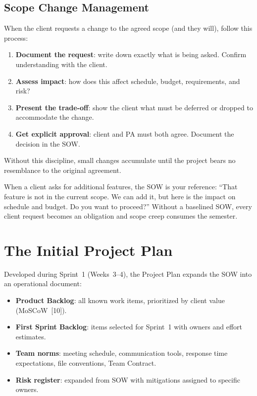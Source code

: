 \subsection{Scope Change Management}
When the client requests a change to the agreed scope (and they will), follow this process:
\begin{enumerate}[nosep,leftmargin=1.5em]
\item \textbf{Document the request}: write down exactly what is being asked. Confirm understanding with the client.
\item \textbf{Assess impact}: how does this affect schedule, budget, requirements, and risk?
\item \textbf{Present the trade-off}: show the client what must be deferred or dropped to accommodate the change.
\item \textbf{Get explicit approval}: client and PA must both agree. Document the decision in the SOW.
\end{enumerate}

Without this discipline, small changes accumulate until the project bears no resemblance to the original agreement.

\begin{warningbox}
When a client asks for additional features, the SOW is your reference: ``That feature is not in the current scope. We can add it, but here is the impact on schedule and budget. Do you want to proceed?'' Without a baselined SOW, every client request becomes an obligation and scope creep consumes the semester.
\end{warningbox}

\section{The Initial Project Plan}
Developed during Sprint~1 (Weeks~3--4), the Project Plan expands the SOW into an operational document:
\begin{itemize}[nosep,leftmargin=1.5em]
\item \textbf{Product Backlog}: all known work items, prioritized by client value (MoSCoW~[10]).
\item \textbf{First Sprint Backlog}: items selected for Sprint~1 with owners and effort estimates.
\item \textbf{Team norms}: meeting schedule, communication tools, response time expectations, file conventions, Team Contract.
\item \textbf{Risk register}: expanded from SOW with mitigations assigned to specific owners.
\end{itemize}

